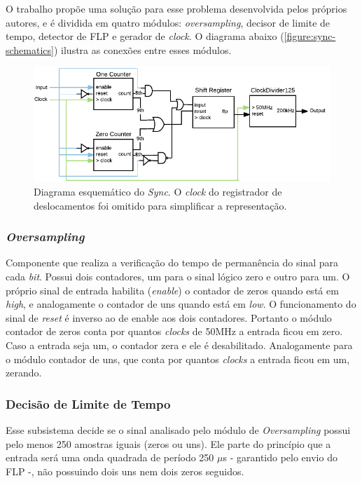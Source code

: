 	O trabalho propõe uma solução para esse problema desenvolvida pelos próprios autores, e é dividida em quatro módulos: \textit{oversampling}, decisor de limite de tempo, detector de FLP e gerador de \textit{clock}. O diagrama abaixo (\autoref{figure:sync-schematics}) ilustra as conexões entre esses módulos.
	\begin{figure}[h]
		\caption{\label{figure:sync-schematics}Diagrama esquemático do \textit{Sync}. O \textit{clock} do registrador de deslocamentos foi omitido para simplificar a representação.}
		\centering
		\includegraphics[width=1\textwidth]{sync/schematics.pdf}
	\end{figure}
	
	\subsubsection{\textit{Oversampling}}
	Componente que realiza a verificação do tempo de permanência do sinal para cada \textit{bit}. Possui dois contadores, um para o sinal lógico zero e outro para um. O próprio sinal de entrada habilita (\textit{enable}) o contador de zeros quando está em \textit{high}, e analogamente o contador de uns quando está em \textit{low}. O funcionamento do sinal de \textit{reset} é inverso ao de enable aos dois contadores. Portanto o módulo contador de zeros conta por quantos \textit{clocks} de 50MHz a entrada ficou em zero. Caso a entrada seja um, o contador zera e ele é desabilitado. Analogamente para o módulo contador de uns, que conta por quantos \textit{clocks} a entrada ficou em um, zerando.

	\subsubsection{Decisão de Limite de Tempo}
	Esse subsistema decide se o sinal analisado pelo módulo de \textit{Oversampling} possui pelo menos 250 amostras iguais (zeros ou uns). Ele parte do princípio que a entrada será uma onda quadrada de período 250 $\mu$s - garantido pelo envio do FLP -, não possuindo dois uns nem dois zeros seguidos.
	

